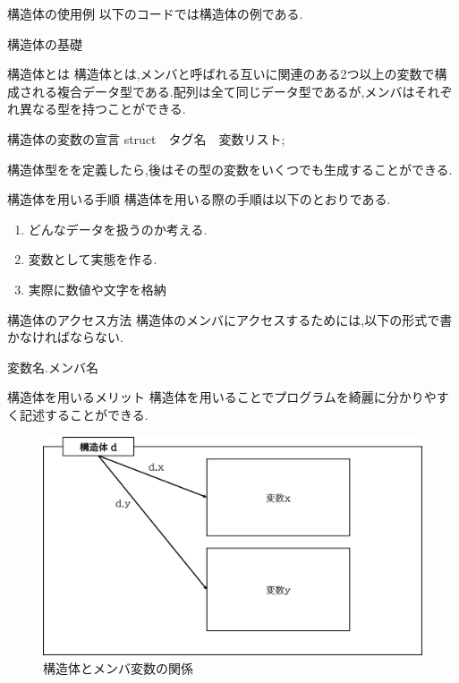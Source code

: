 \begin{frame}[fragile]{構造体の使用例}
 以下のコードでは構造体の例である.   
    \begin{minipage}{\linewidth}
        
    \end{minipage}
\end{frame}

\begin{frame}{構造体の基礎}
    \begin{block}{構造体とは}
        構造体とは,メンバと呼ばれる互いに関連のある2つ以上の変数で構成される複合データ型である.配列は全て同じデータ型であるが,メンバはそれぞれ異なる型を持つことができる.
    \end{block}
    
    \begin{block}{構造体の変数の宣言}
        struct　タグ名　変数リスト;
    \end{block}

    \newpage

    構造体型をを定義したら,後はその型の変数をいくつでも生成することができる.
    \begin{block}{構造体を用いる手順}
        構造体を用いる際の手順は以下のとおりである.
        \begin{enumerate}
            \item どんなデータを扱うのか考える.
            \item 変数として実態を作る.
            \item 実際に数値や文字を格納
        \end{enumerate}
    \end{block}    
    \begin{block}{構造体のアクセス方法}
        構造体のメンバにアクセスするためには,以下の形式で書かなければならない.

        変数名.メンバ名
    \end{block}
    \begin{exampleblock}{構造体を用いるメリット}
        構造体を用いることでプログラムを綺麗に分かりやすく記述することができる.
    \end{exampleblock}

    \newpage

    \begin{figure}[h]
        \centering
        \includegraphics[width=0.5\linewidth]{png/str.png}
        \caption{構造体とメンバ変数の関係}
        \label{fig:enter-label}
    \end{figure}
\end{frame}

